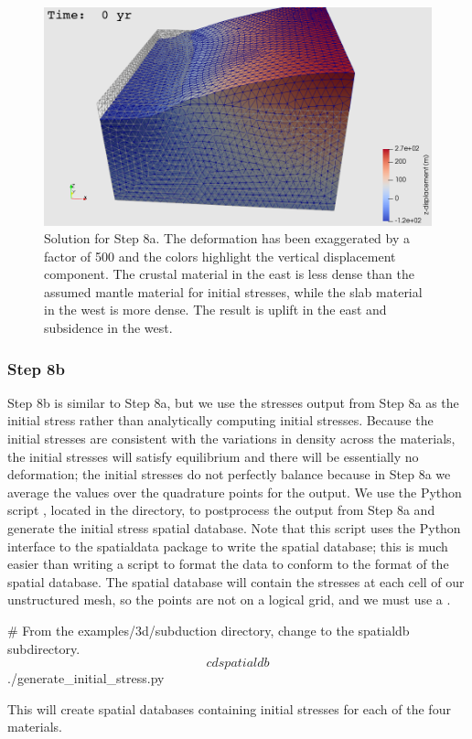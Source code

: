 \begin{figure}
  \includegraphics[width=4.5in]{examples/figs/subduction3d_step08a_soln}
  \caption{Solution for Step 8a. The deformation has been exaggerated
    by a factor of 500 and the colors highlight the vertical
    displacement component. The crustal material in the
    east is less dense than the assumed mantle material for initial
    stresses, while the slab material in the west is more dense. The
    result is uplift in the east and subsidence in the west.}
  \label{fig:example:subduction:3d:step08a}
\end{figure}

\subsubsection{Step 8b}

Step 8b is similar to Step 8a, but we use the stresses output from
Step 8a as the initial stress rather than analytically computing
initial stresses. Because the initial stresses are consistent with the
variations in density across the materials, the initial stresses will
satisfy equilibrium and there will be essentially no deformation; the
initial stresses do not perfectly balance because in Step 8a we
average the values over the quadrature points for the output. We use
the Python script , located in
the  directory, to postprocess the output from
Step 8a and generate the initial stress spatial database. Note that
this script uses the Python interface to the spatialdata package to
write the spatial database; this is much easier than writing a script
to format the data to conform to the format of the spatial
database. The spatial database will contain the stresses at each cell
of our unstructured mesh, so the points are not on a logical grid, and
we must use a .
\begin{shell}
# From the examples/3d/subduction directory, change to the spatialdb subdirectory.
$$ cd spatialdb
$$ ./generate_initial_stress.py
\end{shell}
This will create spatial databases containing initial stresses for
each of the four materials.

